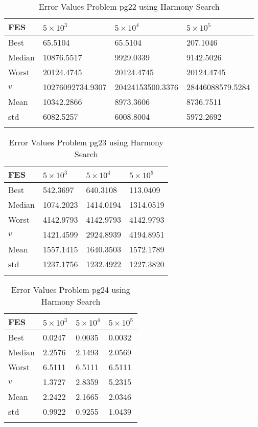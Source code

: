 \documentclass[10pt, a4paper]{book}
\begin{document}
\begin{center}
\begin{longtable}{l l l l}
FES & $5 \times 10^{3}$ & $5 \times 10^{4}$ & $5 \times 10^{5}$ \\
\hline
Best & 65.5104 & 65.5104 & 207.1046 \\
Median & 10876.5517 & 9929.0339 & 9142.5026 \\
Worst & 20124.4745 & 20124.4745 & 20124.4745 \\
$v$ & 10276092734.9307 & 20424153500.3376 & 28446088579.5284 \\
Mean & 10342.2866 & 8973.3606 & 8736.7511 \\
std & 6082.5257 & 6008.8004 & 5972.2692 \\
\caption{ Error Values Problem pg22 using Harmony Search }
\end{longtable}
\end{center}

\begin{center}
\begin{longtable}{l l l l}
FES & $5 \times 10^{3}$ & $5 \times 10^{4}$ & $5 \times 10^{5}$ \\
\hline
Best & 542.3697 & 640.3108 & 113.0409 \\
Median & 1074.2023 & 1414.0194 & 1314.0519 \\
Worst & 4142.9793 & 4142.9793 & 4142.9793 \\
$v$ & 1421.4599 & 2924.8939 & 4194.8951 \\
Mean & 1557.1415 & 1640.3503 & 1572.1789 \\
std & 1237.1756 & 1232.4922 & 1227.3820 \\
\caption{ Error Values Problem pg23 using Harmony Search }
\end{longtable}
\end{center}

\begin{center}
\begin{longtable}{l l l l}
FES & $5 \times 10^{3}$ & $5 \times 10^{4}$ & $5 \times 10^{5}$ \\
\hline
Best & 0.0247 & 0.0035 & 0.0032 \\
Median & 2.2576 & 2.1493 & 2.0569 \\
Worst & 6.5111 & 6.5111 & 6.5111 \\
$v$ & 1.3727 & 2.8359 & 5.2315 \\
Mean & 2.2422 & 2.1665 & 2.0346 \\
std & 0.9922 & 0.9255 & 1.0439 \\
\caption{ Error Values Problem pg24 using Harmony Search }
\end{longtable}
\end{center}
\end{document}

